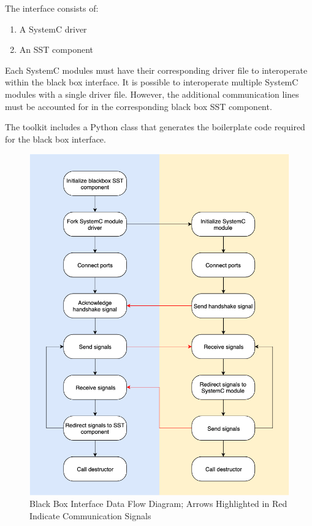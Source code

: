 \documentclass{article}
\begin{document}
  The interface consists of:
  \begin{enumerate}
    \item A SystemC driver
    \item An SST component
  \end{enumerate}

  Each SystemC modules must have their corresponding driver file to interoperate within the black
  box interface. It is possible to interoperate multiple SystemC modules with a single driver
  file. However, the additional communication lines must be accounted for in the corresponding
  black box SST component.

  The toolkit includes a Python class that generates the boilerplate code required for the black
  box interface.

  \begin{figure}[!h]
    \centering
    \includegraphics[width=5in]{diagrams/data_flow.png}
    \caption{Black Box Interface Data Flow Diagram; Arrows Highlighted in Red Indicate Communication Signals}
    \label{fig:data_flow}
  \end{figure}
\end{document}
